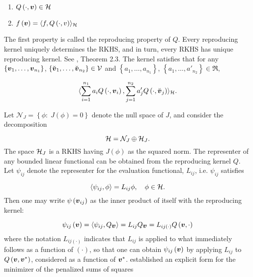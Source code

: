\begin{enumerate}
\item $Q\left(\cdot, \mbox{\boldmath $v$} \right) \in \mathcal{H}$ 
\item $f\left(\mbox{\boldmath $v$}\right) = \langle f, Q\left(\cdot, v\right)\rangle_{\mathcal{H}}$\label{rkhs-reproducing-property}
\end{enumerate}
\noindent
The first property is called the reproducing property of $Q$. Every reproducing kernel uniquely determines the RKHS, and in turn, every RKHS has unique reproducing kernel. See \cite{gu2013smoothing}, Theorem 2.3. The kernel satisfies that for any $\left\{\mbox{\boldmath $v$}_1,\dots, \mbox{\boldmath $v$}_{n_1}\right\}$, $\left\{\breve{\mbox{\boldmath $v$}}_1,\dots, \breve{\mbox{\boldmath $v$}}_{n_2}\right\} \in \mathcal{V}$ and $\left\{a_1,\dots, a_{n_1}\right\}$, $\left\{a_1,\dots, a'_{n_2}\right\} \in \Re$,

\begin{equation}
 \langle\sum_{i = 1}^{n_1} a_i Q\left(\cdot, \mbox{\boldmath $v$}_i\right), \sum_{j = 1}^{n_2} a'_j Q\left(\cdot, \breve{\mbox{\boldmath $v$}}_j\right) \rangle_{\mathcal{H}}.
\end{equation}

\bigskip


Let $\mathcal{N}_J = \left\{ \phi:\; J\left(\phi\right) = 0\right\}$ denote the null space of $J$, and consider the decomposition

\[
\mathcal{H} = \mathcal{N}_J \oplus \mathcal{H}_J.
\]
\noindent
The space $\mathcal{H}_J$ is a RKHS having $J\left(\phi\right)$ as the squared norm. The representer of any bounded linear functional can be obtained from the reproducing kernel $Q$. Let $\psi_{ij}$ denote the representer for the evaluation functional, $L_{ij}$, i.e. $\psi_{ij}$ satisfies

\[
\langle \psi_{ij}, \phi \rangle = L_{ij} \phi, \quad \phi \in \mathcal{H}.
\]
\noindent
Then one may write $\psi\left( \mbox{\boldmath $v$}_{ij} \right)$ as the inner product of itself with the reproducing kernel:

\begin{equation} \label{eq:representer-as-inner-product}
\psi_{ij}\left( \mbox{\boldmath $v$} \right) = \langle \psi_{ij}, Q_{\mbox{\boldmath $v$}} \rangle = L_{ij} Q_{\mbox{\boldmath $v$}} = L_{ij\left(\cdot\right)} Q \left(\mbox{\boldmath $v$},\cdot\right)
\end{equation}
 \noindent
 where the notation $L_{ij\left(\cdot\right)}$ indicates that $L_{ij}$ is applied to what immediately follows as a function of $\left( \cdot \right)$, so that one can obtain $\psi_{ij}\left(\mbox{\boldmath $v$}\right)$ by applying $L_{ij}$ to $Q\left(\mbox{\boldmath $v$}, \mbox{\boldmath $v$}^*\right)$, considered as a function of $\mbox{\boldmath $v$}^*$. \cite{wahba1990spline} established an explicit form for the minimizer of the penalized sums of squares
 
